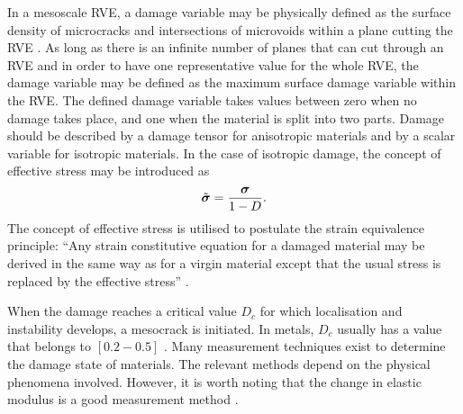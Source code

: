 In a mesoscale RVE, a damage variable may be physically defined as the surface density of microcracks and intersections of microvoids within a plane cutting the RVE \parencite{lemaitre2005engineering}. As long as there is an infinite number of planes that can cut through an RVE and in order to have one representative value for the whole RVE, the damage variable may be defined as the maximum surface damage variable within the RVE. The defined damage variable takes values between zero when no damage takes place, and one when the material is split into two parts. Damage should be described by a damage tensor for anisotropic materials and by a scalar variable for isotropic materials. In the case of isotropic damage, the concept of effective stress may be introduced as
\begin{equation}
	{\tilde{\mbox{$\bm \sigma$}}} = \frac{\mbox{$\bm \sigma$}}{1-D}.
\end{equation}
The concept of effective stress is utilised to postulate the strain equivalence principle: ``Any strain constitutive equation for a damaged material may be derived in the same way as for a virgin material except that the usual stress is replaced by the effective stress'' \parencite{lemaitre1996course}.

When the damage reaches a critical value $D_c$ for which localisation and instability develops, a mesocrack is initiated. In metals, $D_c$ usually has a value that belongs to $[0.2-0.5]$ \parencite{lemaitre1996course}. Many measurement techniques exist to determine the damage state of materials. The relevant methods depend on the physical phenomena involved. However, it is worth noting that the change in elastic modulus is a good measurement method \parencite{lemaitre1996course}.

